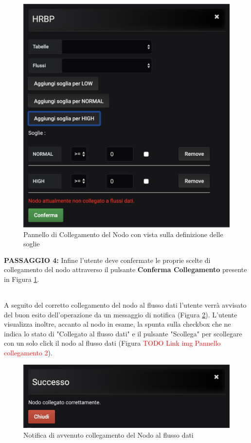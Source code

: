 \begin{figure}[H]
	\begin{center}
		\includegraphics[scale=0.6]{./images/PannelloSoglie.png}
		 \caption{Pannello di Collegamento del Nodo con vista sulla definizione delle soglie}	
		 \label{PannelloSoglie}
	\end{center}
\end{figure}

\textbf{PASSAGGIO 4:} Infine l'utente deve confermate le proprie scelte di collegamento del nodo attraverso il pulsante \textbf{Conferma Collegamento} presente in Figura \ref{PannelloSoglie}.

~\\
A seguito del corretto collegamento del nodo al flusso dati l'utente verrà avvisato del buon esito dell'operazione da un messaggio di notifica (Figura \ref{NotificaCollegamento}). L'utente visualizza inoltre, accanto al nodo in esame, la spunta sulla checkbox che ne indica lo stato di "Collegato al flusso dati" e il pulsante "Scollega" per scollegare con un solo click il nodo al flusso dati (Figura \textcolor{red}{TODO Link img Pannello collegamento 2}).

\begin{figure}[H]
	\begin{center}
		\includegraphics[scale=0.6]{./images/NotificaCollegamento.png}
		 \caption{Notifica di avvenuto collegamento del Nodo al flusso dati}	
		 \label{NotificaCollegamento}
	\end{center}
\end{figure}

